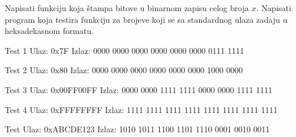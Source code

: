 \begin{Exercise}[label=201]
Napisati funkciju  koja štampa bitove u binarnom zapisu celog broja $x$. Napisati program koja testira funkciju  za brojeve koji se sa standardnog ulaza zadaju u heksadekasnom formatu.


\begin{maxitest}
\begin{test}{Test 1}
Ulaz:   0x7F  
Izlaz:  0000 0000 0000 0000 0000 0000 0111 1111    
\end{test}
\end{maxitest}

\begin{maxitest}
\begin{test}{Test 2}
Ulaz:   0x80
Izlaz:  0000 0000 0000 0000 0000 0000 1000 0000 
\end{test}
\end{maxitest}

\begin{maxitest}
\begin{test}{Test 3}
Ulaz:   0x00FF00FF
Izlaz:  0000 0000 1111 1111 0000 0000 1111 1111
\end{test}
\end{maxitest}

\begin{maxitest}
\begin{test}{Test 4}
Ulaz:   0xFFFFFFFF
Izlaz:  1111 1111 1111 1111 1111 1111 1111 1111 
\end{test}
\end{maxitest}

\begin{maxitest}
\begin{test}{Test }
Ulaz:   0xABCDE123
Izlaz:  1010 1011 1100 1101 1110 0001 0010 0011
\end{test}
\end{maxitest}

\end{Exercise}
\begin{Answer}[ref=201]
\end{Answer}

